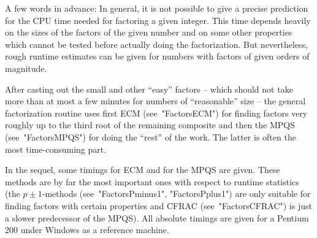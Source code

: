 


A few words in advance: In general, it is not possible to give a precise
prediction for the CPU time needed for factoring a given integer.
This time depends heavily on the sizes of the factors of the given number
and on some other properties which cannot be tested before actually
doing the factorization.
But nevertheless, rough runtime estimates can be given for numbers
with factors of given orders of magnitude.

After casting out the small and other ``easy'' factors -- which should
not take more than at most a few minutes for numbers of
``reasonable'' size -- the general factorization routine uses first ECM
(see~"FactorsECM") for finding factors very roughly up to the third root
of the remaining composite and then the MPQS (see~"FactorsMPQS") for
doing the ``rest'' of the work. The latter is often the most
time-consuming part.

In the sequel, some timings for ECM and for the MPQS are given.
These methods are by far the most important ones with respect to
runtime statistics (the $p \pm 1$-methods (see~"FactorsPminus1",
"FactorsPplus1") are only suitable for finding factors with certain
properties and CFRAC (see~"FactorsCFRAC") is just a slower
predecessor of the MPQS). All absolute timings are given for a
Pentium 200 under Windows as a reference machine.


